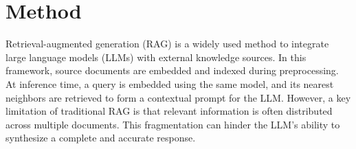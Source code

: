 





\section{Method}
\label{sec:method}

Retrieval-augmented generation (RAG) \citep{gao2024retrievalaugmentedgenerationlargelanguage, lewis2020retrieval} is a widely used method to integrate large language models (LLMs) with external knowledge sources. In this framework, source documents are embedded and indexed during preprocessing. At inference time, a query is embedded using the same model, and its nearest neighbors are retrieved to form a contextual prompt for the LLM. However, a key limitation of traditional RAG is that relevant information is often distributed across multiple documents. This fragmentation can hinder the LLM’s ability to synthesize a complete and accurate response.

